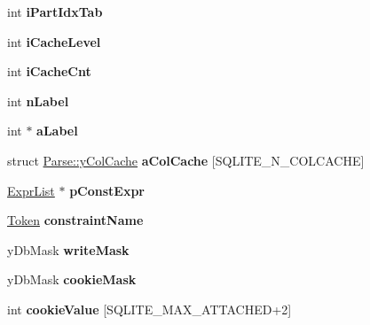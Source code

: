 \begin{DoxyCompactItemize}
\item 
\hypertarget{struct_parse_afe732860c3e2cd6e97da3786aaca7e74}{int {\bfseries i\+Part\+Idx\+Tab}}\label{struct_parse_afe732860c3e2cd6e97da3786aaca7e74}

\item 
\hypertarget{struct_parse_a5b06d03e7605a6f55369481c050ac0a8}{int {\bfseries i\+Cache\+Level}}\label{struct_parse_a5b06d03e7605a6f55369481c050ac0a8}

\item 
\hypertarget{struct_parse_ac4633493fd5f100fa823344be1c19d1e}{int {\bfseries i\+Cache\+Cnt}}\label{struct_parse_ac4633493fd5f100fa823344be1c19d1e}

\item 
\hypertarget{struct_parse_ab1a2fa5eb16fefcff4f61b19a1468f7d}{int {\bfseries n\+Label}}\label{struct_parse_ab1a2fa5eb16fefcff4f61b19a1468f7d}

\item 
\hypertarget{struct_parse_a67e861822e4cec97b0e45ec16fac3250}{int $\ast$ {\bfseries a\+Label}}\label{struct_parse_a67e861822e4cec97b0e45ec16fac3250}

\item 
\hypertarget{struct_parse_a788b85979d58b84e06bc367bac5b3f3f}{struct \hyperlink{struct_parse_1_1y_col_cache}{Parse\+::y\+Col\+Cache} {\bfseries a\+Col\+Cache} \mbox{[}S\+Q\+L\+I\+T\+E\+\_\+\+N\+\_\+\+C\+O\+L\+C\+A\+C\+H\+E\mbox{]}}\label{struct_parse_a788b85979d58b84e06bc367bac5b3f3f}

\item 
\hypertarget{struct_parse_ab908ea67b6ac078ee3836fb8bf243002}{\hyperlink{struct_expr_list}{Expr\+List} $\ast$ {\bfseries p\+Const\+Expr}}\label{struct_parse_ab908ea67b6ac078ee3836fb8bf243002}

\item 
\hypertarget{struct_parse_a40cbce90eedbd57143416c8bc28fec46}{\hyperlink{struct_token}{Token} {\bfseries constraint\+Name}}\label{struct_parse_a40cbce90eedbd57143416c8bc28fec46}

\item 
\hypertarget{struct_parse_a4939b6d4fd3f48731b58b8a6f51417cd}{y\+Db\+Mask {\bfseries write\+Mask}}\label{struct_parse_a4939b6d4fd3f48731b58b8a6f51417cd}

\item 
\hypertarget{struct_parse_a7c0b37cf797fd157234cb2e306cba2e4}{y\+Db\+Mask {\bfseries cookie\+Mask}}\label{struct_parse_a7c0b37cf797fd157234cb2e306cba2e4}

\item 
\hypertarget{struct_parse_a6023169734f87ce27a760e0f9026c381}{int {\bfseries cookie\+Value} \mbox{[}S\+Q\+L\+I\+T\+E\+\_\+\+M\+A\+X\+\_\+\+A\+T\+T\+A\+C\+H\+E\+D+2\mbox{]}}\label{struct_parse_a6023169734f87ce27a760e0f9026c381}


\end{DoxyCompactItemize}
